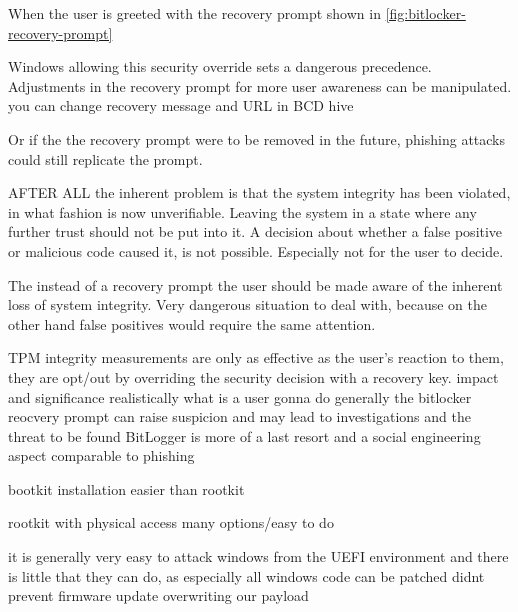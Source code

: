 When the user is greeted with the recovery prompt shown in \autoref{fig:bitlocker-recovery-prompt}

Windows allowing this security override sets a dangerous precedence.
Adjustments in the recovery prompt for more user awareness can be manipulated.
you can change recovery message and URL in BCD hive

Or if the the recovery prompt were to be removed in the future, phishing attacks could still replicate the prompt.

AFTER ALL the inherent problem is that the system integrity has been violated, in what fashion is now unverifiable.
Leaving the system in a state where any further trust should not be put into it.
A decision about whether a false positive or malicious code caused it, is not possible.
Especially not for the user to decide.


The instead of a recovery prompt the user should be made aware of the inherent loss of system integrity.
Very dangerous situation to deal with, because on the other hand false positives would require the same attention.




\ac{TPM} integrity measurements are only as effective as the user's reaction to them, they are opt\-/out by overriding the security decision with a recovery key.
impact and significance
realistically what is a user gonna do
generally the bitlocker reocvery prompt can raise suspicion and may lead to investigations and the threat to be found
BitLogger is more of a last resort and a social engineering aspect comparable to phishing


bootkit installation easier than rootkit

rootkit with physical access many options/easy to do


it is generally very easy to attack windows from the \ac{UEFI} environment and there is little that they can do, as especially all windows code can be patched
didnt prevent firmware update overwriting our payload





